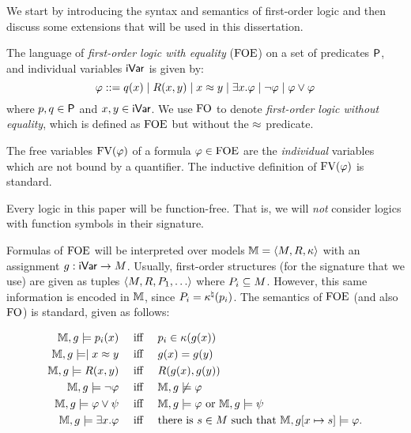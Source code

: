 

We start by introducing the syntax and semantics of first-order logic and then discuss some extensions that will be used in this dissertation.

\begin{definition}
The language of \emph{first-order logic with equality} ($\mathrm{FOE}$) on a set of predicates $\mathsf{P}$, and individual variables $\mathsf{iVar}$ is given by:\[
\varphi ::= q(x) \mid R(x,y) \mid x \approx y \mid \exists x.\varphi \mid \lnot\varphi \mid \varphi \lor \varphi
\]
where $p,q\in\mathsf{P}$ and $x,y\in\mathsf{iVar}$. We use $\mathrm{FO}$ to denote \emph{first-order logic without equality}, which is defined as $\mathrm{FOE}$ but without the $\approx$ predicate.
\end{definition}


The free variables $\textup{FV}(\varphi)$ of a formula $\varphi\in\mathrm{FOE}$ are the \emph{individual} variables which are not bound by a quantifier. The inductive definition of $\textup{FV}(\varphi)$ is standard.

\begin{remark}
	Every logic in this paper will be function-free. That is, we will \emph{not} consider logics with function symbols in their signature.
\end{remark}


Formulas of $\mathrm{FOE}$ will be interpreted over models $\mathbb{M} = \langle{M, R, \kappa}\rangle$ with an assignment $g: \mathsf{iVar} \to M$. Usually, first-order structures (for the signature that we use) are given as tuples $\langle{M,R, P_1, \dots}\rangle$ where $P_i \subseteq M$. However, this same information is encoded in $\mathbb{M}$, since $P_i = \kappa^\natural(p_i)$. The semantics of $\mathrm{FOE}$ (and also $\mathrm{FO}$) is standard, given as follows:
%

\begin{align*}
\npmodel,\ass \models p_i(x) & \quad\text{ iff }\quad  p_i \in \tscolors(\ass(x)) \\
\npmodel,\ass \models \mid x \foeq y & \quad\text{ iff }\quad \ass(x) = \ass(y) \\
\npmodel,\ass \models R(x,y) & \quad\text{ iff }\quad {R}(\ass(x),\ass(y)) \\
\npmodel,\ass \models \lnot\varphi & \quad\text{ iff }\quad  \npmodel,\ass \not\models \varphi \\
\npmodel,\ass \models \varphi\lor\psi & \quad\text{ iff }\quad  \npmodel,\ass \models \varphi \text{ or } \npmodel,\ass \models \psi \\
\npmodel,\ass \models \exists x.\varphi & \quad\text{ iff }\quad  \text{there is $s \in \npmoddom$ such that $\npmodel, \ass[x\mapsto s] \models \varphi$}.
\end{align*}
